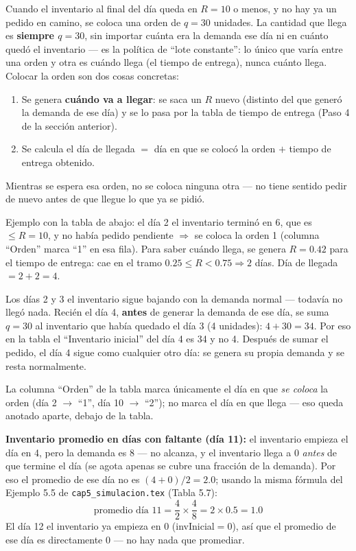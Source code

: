 \documentclass[12pt]{article}
\begin{document}
Cuando el inventario al final del día queda en $R=10$ o menos, y no hay ya un pedido en camino, se coloca una orden de $q=30$ unidades. La cantidad que llega es \textbf{siempre $q=30$}, sin importar cuánta era la demanda ese día ni en cuánto quedó el inventario — es la política de ``lote constante'': lo único que varía entre una orden y otra es cuándo llega (el tiempo de entrega), nunca cuánto llega. Colocar la orden son dos cosas concretas:
\begin{enumerate}
    \item Se genera \textbf{cuándo va a llegar}: se saca un $R$ nuevo (distinto del que generó la demanda de ese día) y se lo pasa por la tabla de tiempo de entrega (Paso 4 de la sección anterior).
    \item Se calcula el día de llegada $=$ día en que se colocó la orden $+$ tiempo de entrega obtenido.
\end{enumerate}
Mientras se espera esa orden, no se coloca ninguna otra — no tiene sentido pedir de nuevo antes de que llegue lo que ya se pidió.

Ejemplo con la tabla de abajo: el día 2 el inventario terminó en 6, que es $\leq R=10$, y no había pedido pendiente $\Rightarrow$ se coloca la orden 1 (columna ``Orden'' marca ``1'' en esa fila). Para saber cuándo llega, se genera $R=0.42$ para el tiempo de entrega: cae en el tramo $0.25 \leq R < 0.75 \Rightarrow 2$ días. Día de llegada $= 2+2 = 4$.

Los días 2 y 3 el inventario sigue bajando con la demanda normal — todavía no llegó nada. Recién el día 4, \textbf{antes} de generar la demanda de ese día, se suma $q=30$ al inventario que había quedado el día 3 (4 unidades): $4+30=34$. Por eso en la tabla el ``Inventario inicial'' del día 4 es 34 y no 4. Después de sumar el pedido, el día 4 sigue como cualquier otro día: se genera su propia demanda y se resta normalmente.

La columna ``Orden'' de la tabla marca únicamente el día en que \emph{se coloca} la orden (día 2 $\to$ ``1'', día 10 $\to$ ``2''); no marca el día en que llega — eso queda anotado aparte, debajo de la tabla.

\textbf{Inventario promedio en días con faltante (día 11):} el inventario empieza el día en 4, pero la demanda es 8 — no alcanza, y el inventario llega a 0 \emph{antes} de que termine el día (se agota apenas se cubre una fracción de la demanda). Por eso el promedio de ese día no es $(4+0)/2=2.0$; usando la misma fórmula del Ejemplo 5.5 de \texttt{cap5\_simulacion.tex} (Tabla 5.7):
\[
\text{promedio día 11} = \frac{4}{2} \times \frac{4}{8} = 2 \times 0.5 = 1.0
\]
El día 12 el inventario ya empieza en 0 (invInicial$=0$), así que el promedio de ese día es directamente $0$ — no hay nada que promediar.
\end{document}
